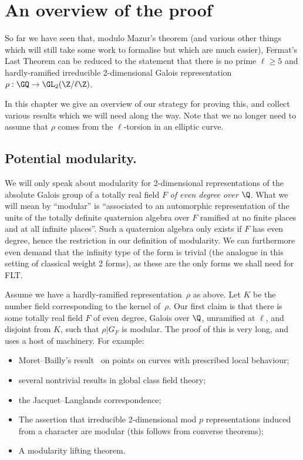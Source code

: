 \chapter{An overview of the proof}\label{ch_overview}

So far we have seen that, modulo Mazur's theorem (and various other things which will still take some work to formalise but which are much easier), Fermat's Last Theorem can be reduced
to the statement that there is no prime $\ell\geq 5$ and hardly-ramified
irreducible 2-dimensional Galois representation $\rho:\GQ\to\GL_2(\Z/\ell\Z)$.

In this chapter we give an overview of our strategy for proving this, and collect
various results which we will need along the way. Note that we no longer need to assume that $\rho$ comes from the $\ell$-torsion in an elliptic curve.

\section{Potential modularity.}

We will only speak about modularity for 2-dimensional representations of the
absolute Galois group of a totally real field $F$ \emph{of even degree over} $\Q$.
What we will mean by ``modular'' is ``associated to an automorphic representation of the
units of the totally definite quaternion algebra over $F$ ramified at no finite places
and at all infinite places''. Such a quaternion algebra only exists if $F$ has even degree,
hence the restriction in our definition of modularity.
We can furthermore even demand that the infinity type of the form is trivial (the analogue
in this setting of classical weight 2 forms), as these are the only forms we shall need for FLT.

Assume we have a hardly-ramified representation~$\rho$ as above. Let $K$
be the number field corresponding to the kernel of~$\rho$. Our first claim
is that there is some totally real field $F$ of even degree, Galois over $\Q$,
unramified at $\ell$, and disjoint from $K$, such that $\rho|G_F$ is modular.
The proof of this is very long, and uses a host of machinery. For example:
\begin{itemize}
    \item Moret--Bailly's result~\cite{moret-bailly} on points on curves with prescribed
    local behaviour;
    \item several nontrivial results in global class field theory;
    \item the Jacquet--Langlands correspondence;
    \item The assertion that irreducible 2-dimensional mod $p$ representations induced from a character are modular (this follows from converse theorems);
    \item A modularity lifting theorem.
\end{itemize}

